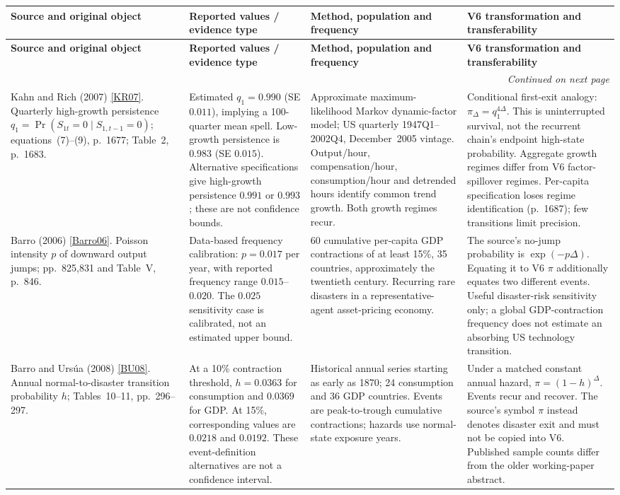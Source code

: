 \documentclass[10pt,a4paper,landscape]{article}
\makeatletter
\newcommand{\src}[1]{\hyperlink{ref:#1}{\textsf{[#1]}}}
\newenvironment{evidence}{%
\fontsize{9.4}{10.9}\selectfont\setlength{\parskip}{2pt}
\begin{longtable}{@{}P{\dimexpr .22\textwidth-7.5pt\relax}P{\dimexpr .24\textwidth-7.5pt\relax}P{\dimexpr .25\textwidth-7.5pt\relax}P{\dimexpr .29\textwidth-7.5pt\relax}@{}}
\toprule\rowcolor{tablehead}\textbf{Source and original object} & \textbf{Reported values / evidence type} & \textbf{Method, population and frequency} & \textbf{V6 transformation and transferability}\\\midrule
\endfirsthead
\toprule\rowcolor{tablehead}\textbf{Source and original object} & \textbf{Reported values / evidence type} & \textbf{Method, population and frequency} & \textbf{V6 transformation and transferability}\\\midrule
\endhead
\midrule\multicolumn{4}{r}{\footnotesize\itshape Continued on next page}\\\endfoot
\bottomrule\endlastfoot
}{\end{longtable}}
\makeatother
\begin{document}
\begin{evidence}
Kahn and Rich (2007) \src{KR07}.
Quarterly high-growth persistence $q_1=\Pr(S_{1t}=0\mid S_{1,t-1}=0)$;
equations~(7)--(9), p.~1677; Table~2, p.~1683.
&
Estimated $q_1=0.990$ (SE $0.011$), implying a 100-quarter mean spell.
Low-growth persistence is $0.983$ (SE $0.015$).
Alternative specifications give high-growth persistence $0.991$ or $0.993$;
these are not confidence bounds.
&
Approximate maximum-likelihood Markov dynamic-factor model; US quarterly
1947Q1--2002Q4, December~2005 vintage. Output/hour, compensation/hour,
consumption/hour and detrended hours identify common trend growth. Both
growth regimes recur.
&
Conditional first-exit analogy: $\pi_\Delta=q_1^{4\Delta}$.
This is uninterrupted survival, not the recurrent chain's endpoint high-state
probability. Aggregate growth regimes differ from V6 factor-spillover regimes.
Per-capita specification loses regime identification (p.~1687);
few transitions limit precision.
\\[5pt]
Barro (2006) \src{Barro06}.
Poisson intensity $p$ of downward output jumps; pp.~825,831 and Table~V, p.~846.
&
Data-based frequency calibration: $p=0.017$ per year, with reported
frequency range $0.015$--$0.020$.
The $0.025$ sensitivity case is calibrated, not an estimated upper bound.
&
60 cumulative per-capita GDP contractions of at least 15\%, 35 countries,
approximately the twentieth century. Recurring rare disasters in a
representative-agent asset-pricing economy.
&
The source's no-jump probability is $\exp(-p\Delta)$.
Equating it to V6 $\pi$ additionally equates two different events.
Useful disaster-risk sensitivity only; a global GDP-contraction frequency
does not estimate an absorbing US technology transition.
\\[5pt]
Barro and Urs\'ua (2008) \src{BU08}.
Annual normal-to-disaster transition probability $h$; Tables~10--11,
pp.~296--297.
&
At a 10\% contraction threshold, $h=0.0363$ for consumption and $0.0369$
for GDP. At 15\%, corresponding values are $0.0218$ and $0.0192$.
These event-definition alternatives are not a confidence interval.
&
Historical annual series starting as early as 1870; 24 consumption and
36 GDP countries. Events are peak-to-trough cumulative contractions;
hazards use normal-state exposure years.
&
Under a matched constant annual hazard, $\pi=(1-h)^\Delta$.
Events recur and recover. The source's symbol $\pi$ instead denotes
disaster exit and must not be copied into V6. Published sample counts
differ from the older working-paper abstract.
\\[5pt]
\end{evidence}
\end{document}
